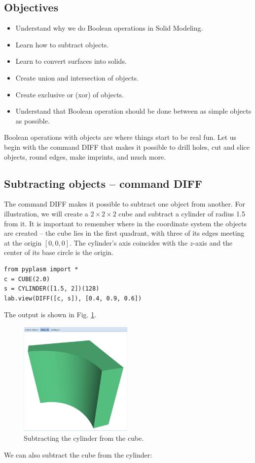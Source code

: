 \documentclass{article}
\begin{document}
\subsection{Objectives}
\begin{itemize}
\item Understand why we do Boolean operations in Solid Modeling.
\item Learn how to subtract objects.
\item Learn to convert surfaces into solids.
\item Create union and intersection of objects.
\item Create exclusive or (xor) of objects.
\item Understand that Boolean operation should be done between as simple
      objects as possible. 
\end{itemize}
Boolean operations with objects are where things start to be real 
fun. Let us begin with the 
command DIFF that makes it possible to drill holes, cut and slice objects, 
round edges, make imprints, and much more.

\subsection{Subtracting objects -- command DIFF}

The command DIFF makes it possible to subtract one object from another.
For illustration, we will create a $2 \times 2 \times 2$ cube and subtract 
a cylinder of radius 1.5 from it. It is important to remember where in the 
coordinate system the objects are created -- the cube lies in the 
first quadrant, with three of its edges meeting at the origin $[0, 0, 0]$.
The cylinder's axis coincides with the $z$-axis and the center of its base
circle is the origin. 

\begin{verbatim}
from pyplasm import *
c = CUBE(2.0)
s = CYLINDER([1.5, 2])(128)
lab.view(DIFF([c, s]), [0.4, 0.9, 0.6]) 
\end{verbatim}
The output is shown in Fig. \ref{fig:diff-1}.

\begin{figure}[!ht]
\begin{center}
\includegraphics[width=0.5\textwidth]{img/diff-1.png}
\end{center}
\vspace{-2mm}
\caption{Subtracting the cylinder from the cube.}
\label{fig:diff-1}
\end{figure}
\noindent
We can also subtract the cube from the cylinder:
\end{document}
